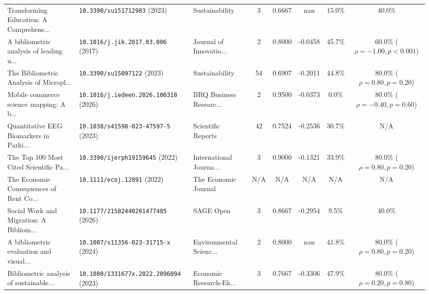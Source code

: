 \begin{table}[t]
{\begin{tabular}{P{4.5cm}P{3.8cm}P{3.0cm}ccccc}
Transforming Education: A Comprehens... & {\footnotesize\nolinkurl{10.3390/su151712983}} (2023) & Sustainability & 3 & 0.6667 & nan & 15.0\% & 40.0\% \\
A bibliometric analysis of leading u... & {\footnotesize\nolinkurl{10.1016/j.jik.2017.03.006}} (2017) & Journal of Innovatio... & 2 & 0.8000 & -0.0458 & 45.7\% & 60.0\% ($\rho=-1.00, p<0.001$) \\
The Bibliometric Analysis of Micropl... & {\footnotesize\nolinkurl{10.3390/su15097122}} (2023) & Sustainability & 54 & 0.6907 & -0.2011 & 44.8\% & 80.0\% ($\rho=0.80, p=0.20$) \\
Mobile commerce science mapping: A b... & {\footnotesize\nolinkurl{10.1016/j.iedeen.2026.100318}} (2026) & BRQ Business Researc... & 2 & 0.9500 & -0.0373 & 0.0\% & 80.0\% ($\rho=-0.40, p=0.60$) \\
Quantitative EEG Biomarkers in Parki... & {\footnotesize\nolinkurl{10.1038/s41598-023-47597-5}} (2023) & Scientific Reports & 42 & 0.7524 & -0.2536 & 30.7\% & N/A \\
The Top 100 Most Cited Scientific Pa... & {\footnotesize\nolinkurl{10.3390/ijerph19159645}} (2022) & International Journa... & 3 & 0.9000 & -0.1321 & 33.9\% & 80.0\% ($\rho=0.80, p=0.20$) \\
The Economic Consequences of Rent Co... & {\footnotesize\nolinkurl{10.1111/ecoj.12891}} (2022) & The Economic Journal & N/A & N/A & N/A & N/A & N/A \\
Social Work and Migration: A Bibliom... & {\footnotesize\nolinkurl{10.1177/21582440261477485}} (2026) & SAGE Open & 3 & 0.8667 & -0.2954 & 9.5\% & 40.0\% \\
A bibliometric evaluation and visual... & {\footnotesize\nolinkurl{10.1007/s11356-023-31715-x}} (2024) & Environmental Scienc... & 2 & 0.8000 & nan & 41.8\% & 80.0\% ($\rho=0.80, p=0.20$) \\
Bibliometric analysis of sustainable... & {\footnotesize\nolinkurl{10.1080/1331677x.2022.2096094}} (2023) & Economic Research-Ek... & 3 & 0.7667 & -0.3306 & 47.9\% & 80.0\% ($\rho=0.20, p=0.80$) \\
\hline
\end{tabular}%
}
\end{table}
